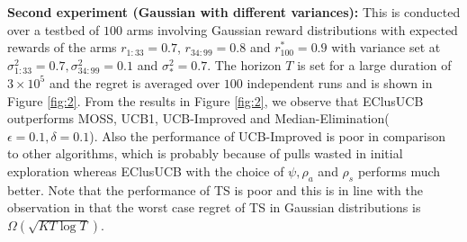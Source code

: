 \textbf{Second experiment (Gaussian with different variances):} This is conducted over a testbed of $100$ arms involving Gaussian reward distributions with expected rewards of the arms $r_{1:33}=0.7$, $r_{34:99}=0.8$ and $r^{*}_{100}=0.9$ with variance set at $\sigma_{1:33}^{2} = 0.7,\sigma_{34:99}^{2} = 0.1$ and $\sigma_{*}^{2}=0.7$. The horizon $T$ is set for a large duration of $3\times 10^{5}$ and the regret is averaged over $100$ independent runs and is shown in Figure \ref{fig:2}. From the results in Figure \ref{fig:2}, we observe that EClusUCB outperforms MOSS, UCB1, UCB-Improved and Median-Elimination($\epsilon=0.1,\delta=0.1$). Also the performance of UCB-Improved is poor in comparison to other algorithms, which is probably because of pulls wasted in initial exploration whereas EClusUCB with the choice of $\psi, \rho_{a}$ and $\rho_{s}$ performs much better. Note that the performance of TS is poor and this is in line with the observation in \cite{lattimore2015optimally} that the worst case regret of TS in Gaussian distributions is $\Omega\left( \sqrt{KT\log T}\right)$.

